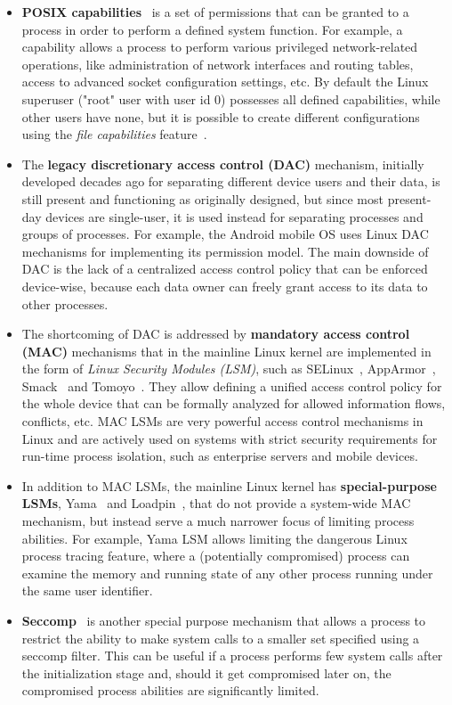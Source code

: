 \begin{itemize}
	\item \textbf{POSIX capabilities}~\cite{caps} is a set of permissions that can be granted to a process in order to perform a defined system function. For example, a  capability allows a process to perform various privileged network-related operations, like administration of network interfaces and routing tables, access to advanced socket configuration settings, etc. By default the Linux superuser ("root" user with user id 0) possesses all defined capabilities, while other users have none, but it is possible to create different configurations using the \textit{file capabilities} feature~\cite{filecaps}. 
	\item The \textbf{legacy discretionary access control (DAC)} mechanism, initially developed decades ago for separating different device users and their data, is still present and functioning as originally designed, but since most present-day devices are single-user, it is used instead for separating processes and groups of processes. For example, the Android mobile OS uses Linux DAC mechanisms for implementing its permission model. The main downside of DAC is the lack of a centralized access control policy that can be enforced device-wise, because each data owner can freely grant access to its data to other processes. 
	\item The shortcoming of DAC is addressed by \textbf{mandatory access control (MAC)} mechanisms that in the mainline Linux kernel are implemented in the form of \textit{Linux Security Modules (LSM)}, such as SELinux~\cite{smalley2001implementing}, AppArmor~\cite{bauer2006paranoid}, Smack~\cite{bauer2006paranoid} and Tomoyo~\cite{tomoyo}. They allow defining a unified access control policy for the whole device that can be formally analyzed for allowed information flows, conflicts, etc. MAC LSMs are very powerful access control mechanisms in Linux and are actively used on systems with strict security requirements for run-time process isolation, such as enterprise servers and mobile devices. 
	\item In addition to MAC LSMs, the mainline Linux kernel has \textbf{special-purpose LSMs}, Yama~\cite{yama} and Loadpin~\cite{loadpin}, that do not provide a system-wide MAC mechanism, but instead serve a much narrower focus of limiting process abilities. For example, Yama LSM allows limiting the dangerous Linux process tracing feature, where a (potentially compromised) process can examine the memory and running state of any other process running under the same user identifier. 
	\item \textbf{Seccomp}~\cite{seccomp2016} is another special purpose mechanism that allows a process to restrict the ability to make system calls to a smaller set specified using a seccomp filter. This can be useful if a process performs few system calls after the initialization stage and, should it get compromised later on, the compromised process abilities are significantly limited.
\end{itemize} 

